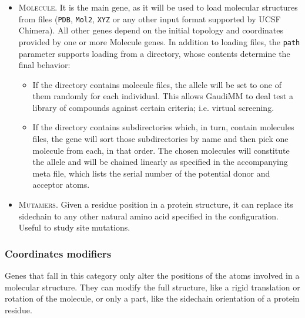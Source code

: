 \begin{itemize}
	\item \textsc{Molecule}. It is the main gene, as it will be used to load molecular structures from files (\texttt{PDB}, \texttt{Mol2}, \texttt{XYZ} or any other input format supported by UCSF Chimera). All other genes depend on the initial topology and coordinates provided by one or more Molecule genes. In addition to loading files, the \texttt{path} parameter supports loading from a directory, whose contents determine the final behavior:
	\begin{itemize}
		\item If the directory contains molecule files, the allele will be set to one of them randomly for each individual. This allows GaudiMM to deal test a library of compounds against certain criteria; i.e. virtual screening.
		\item If the directory contains subdirectories which, in turn, contain molecules files, the gene will sort those subdirectories by name and then pick one molecule from each, in that order. The chosen molecules will constitute the allele and will be chained linearly as specified in the accompanying meta file, which lists the serial number of the potential donor and acceptor atoms.
	\end{itemize}
	\item \textsc{Mutamers}. Given a residue position in a protein structure, it can replace its sidechain to any other natural amino acid specified in the configuration. Useful to study site mutations.
\end{itemize}

\subsubsection{Coordinates modifiers}
Genes that fall in this category only alter the positions of the atoms involved in a molecular structure. They can modify the full structure, like a rigid translation or rotation of the molecule, or only a part, like the sidechain orientation of a protein residue.

